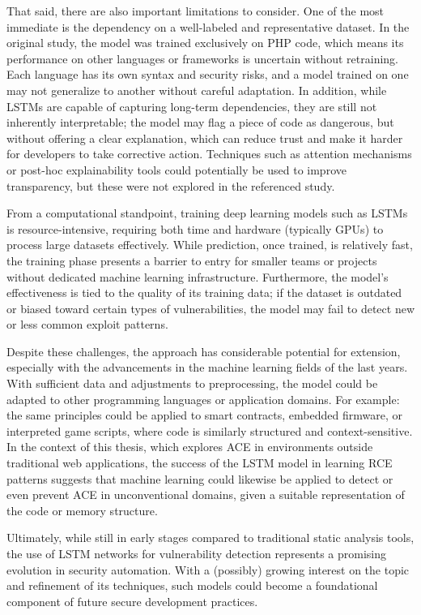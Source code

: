 \documentclass[a4paper]{usiinfbachelorproject}
\begin{document}
That said, there are also important limitations to consider. One of the most immediate is the dependency on a well-labeled and representative dataset. In the original study, the model was trained exclusively on PHP code, which means its performance on other languages or frameworks is uncertain without retraining. Each language has its own syntax and security risks, and a model trained on one may not generalize to another without careful adaptation. In addition, while LSTMs are capable of capturing long-term dependencies, they are still not inherently interpretable; the model may flag a piece of code as dangerous, but without offering a clear explanation, which can reduce trust and make it harder for developers to take corrective action. Techniques such as attention mechanisms or post-hoc explainability tools could potentially be used to improve transparency, but these were not explored in the referenced study.

From a computational standpoint, training deep learning models such as LSTMs is resource-intensive, requiring both time and hardware (typically GPUs) to process large datasets effectively. While prediction, once trained, is relatively fast, the training phase presents a barrier to entry for smaller teams or projects without dedicated machine learning infrastructure. Furthermore, the model’s effectiveness is tied to the quality of its training data; if the dataset is outdated or biased toward certain types of vulnerabilities, the model may fail to detect new or less common exploit patterns.

Despite these challenges, the approach has considerable potential for extension, especially with the advancements in the machine learning fields of the last years. With sufficient data and adjustments to preprocessing, the model could be adapted to other programming languages or application domains. For example: the same principles could be applied to smart contracts, embedded firmware, or interpreted game scripts, where code is similarly structured and context-sensitive. In the context of this thesis, which explores ACE in environments outside traditional web applications, the success of the LSTM model in learning RCE patterns suggests that machine learning could likewise be applied to detect or even prevent ACE in unconventional domains, given a suitable representation of the code or memory structure.

Ultimately, while still in early stages compared to traditional static analysis tools, the use of LSTM networks for vulnerability detection represents a promising evolution in security automation. With a (possibly) growing interest on the topic and refinement of its techniques, such models could become a foundational component of future secure development practices.
\end{document}
